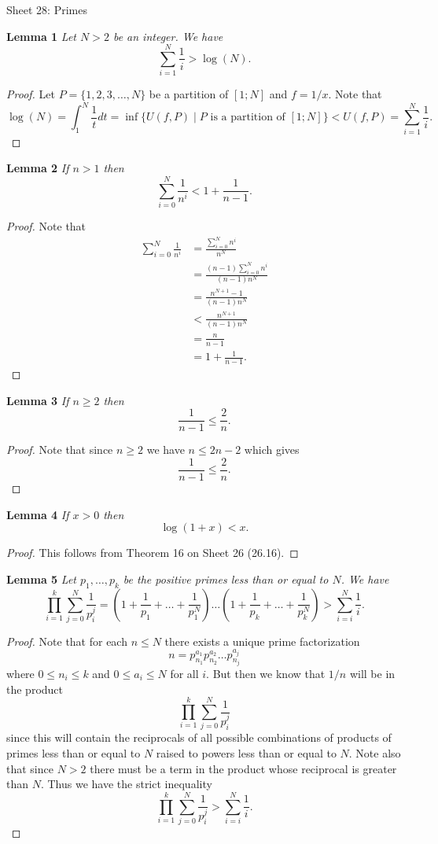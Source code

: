 \documentclass{article}
\begin{document}
\begin{flushleft}

\Large

Sheet 28: Primes\newline

\normalsize

\textbf{Lemma 1}
\textsl{Let $N > 2$ be an integer. We have
\[
\sum_{i=1}^N \frac{1}{i} > \log (N).
\]}
\begin{proof}
Let $P = \{1, 2, 3, \dots , N\}$ be a partition of $[1;N]$ and $f = 1/x$. Note that
\[
\log (N) = \int_1^N \frac{1}{t} dt = \inf \{U(f, P) \mid \text{$P$ is a partition of $[1;N]$}\} < U(f,P) = \sum_{i=1}^N \frac{1}{i}.
\]
\end{proof}

\textbf{Lemma 2}
\textsl{If $n > 1$ then
\[
\sum_{i=0}^N \frac{1}{n^i} < 1 + \frac{1}{n-1}.
\]}
\begin{proof}
Note that
\begin{align*}
\sum_{i=0}^N \frac{1}{n^i} &= \frac{\sum_{i=0}^N n^i}{n^N} \\
					 &= \frac{(n-1) \sum_{i=0}^N n^i}{(n-1) n^N} \\
					 &= \frac{n^{N+1} - 1}{(n-1) n^N} \\
					 &< \frac{n^{N+1}}{(n-1) n^N} \\
					 &= \frac{n}{n-1} \\
					 &= 1 + \frac{1}{n-1}.
\end{align*}
\end{proof}

\textbf{Lemma 3}
\textsl{If $n \geq 2$ then
\[
\frac{1}{n-1} \leq \frac{2}{n}.
\]}
\begin{proof}
Note that since $n \geq 2$ we have $n \leq 2n - 2$ which gives
\[
\frac{1}{n-1} \leq \frac{2}{n}.
\]
\end{proof}

\textbf{Lemma 4}
\textsl{If $x > 0$ then
\[
\log (1+x) < x.
\]}
\begin{proof}
This follows from Theorem 16 on Sheet 26 (26.16).
\end{proof}

\textbf{Lemma 5}
\textsl{Let $p_1, \dots , p_k$ be the positive primes less than or equal to $N$. We have
\[
\prod_{i=1}^k \sum_{j=0}^N \frac{1}{p_i^j} = \left ( 1 + \frac{1}{p_1} + \dots + \frac{1}{p_1^N} \right ) \dots \left ( 1 + \frac{1}{p_k} + \dots + \frac{1}{p_k^N} \right ) > \sum_{i=i}^N \frac{1}{i}.
\]}
\begin{proof}
Note that for each $n \leq N$ there exists a unique prime factorization
\[
n = p_{n_1}^{a_1}p_{n_2}^{a_2} \dots p_{n_j}^{a_j}
\]
where $0 \leq n_i \leq k$ and $0 \leq a_i \leq N$ for all $i$. But then we know that $1/n$ will be in the product
\[
\prod_{i=1}^k \sum_{j=0}^N \frac{1}{p_i^j}
\]
since this will contain the reciprocals of all possible combinations of products of primes less than or equal to $N$ raised to powers less than or equal to $N$. Note also that since $N > 2$ there must be a term in the product whose reciprocal is greater than $N$. Thus we have the strict inequality
\[
\prod_{i=1}^k \sum_{j=0}^N \frac{1}{p_i^j} > \sum_{i=i}^N \frac{1}{i}.
\]
\end{proof}


\end{flushleft}
\end{document}
